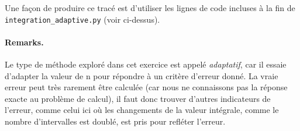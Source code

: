 \documentclass[%
oneside,                 %
final,                   %
10pt,french]{article}
\newenvironment{doconceexercise}{}{}
\begin{document}
\begin{doconceexercise}
Une façon de produire ce tracé est d'utiliser les lignes de code incluses à la fin de \Verb!integration_adaptive.py! (voir ci-dessus).




\paragraph{Remarks.}
Le type de méthode exploré dans cet exercice est appelé \emph{adaptatif}, car il essaie d'adapter la valeur de n pour répondre à un critère d'erreur donné. La vraie erreur peut très rarement être calculée (car nous ne connaissons pas la réponse exacte au problème de calcul), il faut donc trouver d'autres indicateurs de l'erreur, comme celui ici où les changements de la valeur intégrale, comme le nombre d'intervalles est doublé, est pris pour refléter l'erreur.


\end{doconceexercise}


\end{document}
